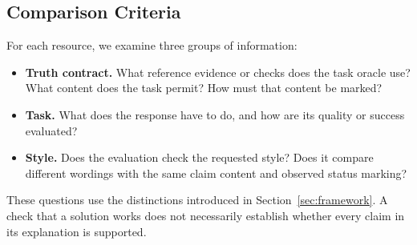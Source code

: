 \documentclass{clv2025}
\begin{document}
\subsection{Comparison Criteria}

For each resource, we examine three groups of information:
\begin{itemize}
\item \textbf{Truth contract.} What reference evidence or checks does the task
oracle use? What content does the task permit? How must that content be marked?
\item \textbf{Task.} What does the response have to do, and how are its quality
or success evaluated?
\item \textbf{Style.} Does the evaluation check the requested style? Does it
compare different wordings with the same claim content and observed status
marking?
\end{itemize}
These questions use the distinctions introduced in
Section~\ref{sec:framework}. A check that a solution works does not necessarily
establish whether every claim in its explanation is supported.
\end{document}
